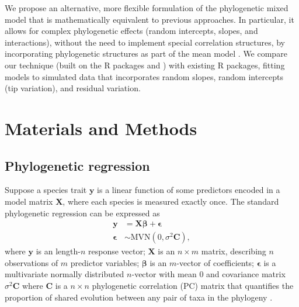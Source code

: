 \documentclass[12pt]{article}
\begin{document}


We propose an alternative, more flexible formulation of the phylogenetic mixed model that is mathematically equivalent to previous approaches.
In particular, it allows for complex phylogenetic effects (random intercepts, slopes, and interactions), without the need to implement special correlation structures, by incorporating phylogenetic structures as part of the mean model \citep{hefley2017basis}.
We compare our technique (built on the R packages  and ) with existing R packages, fitting models to simulated data that incorporates random slopes, random intercepts (tip variation), and residual variation.

\section*{Materials and Methods}

\newcommand{\bX}{{\mathbf X}}
\newcommand{\bbeta}{{\boldsymbol \beta}}
\newcommand{\bmu}{{\boldsymbol \mu}}
\newcommand{\bY}{{\mathbf y}}  %
\newcommand{\bC}{{\mathbf C}}
\newcommand{\bZ}{{\mathbf Z}}
\newcommand{\bb}{{\mathbf b}}
\newcommand{\besp}{{\boldsymbol \epsilon}}
\newcommand{\bSigma}{{\boldsymbol \Sigma}}

\subsection*{Phylogenetic regression}

Suppose a species trait $\bY$ is a linear function of some predictors encoded in a model matrix $\bX$, where each species is measured exactly once. 
The standard phylogenetic regression can be expressed as
\begin{equation}
\begin{aligned}
\bY & = \bX \bbeta + \besp  \\
\besp & \sim \textrm{MVN}(0,\sigma^{2} \bC), 
\label{eq:gls}
\end{aligned}
\end{equation}
where $\bY$ is an length-$n$ response vector; $\bX$ is an $n \times m$ matrix, describing $n$ observations of $m$ predictor variables; $\bbeta$ is an $m$-vector of coefficients; $\besp$ is a multivariate normally distributed $n$-vector with mean $0$ and covariance matrix $\sigma^{2} \bC$ where $\bC$ is a $n \times n$ phylogenetic correlation (PC) matrix that quantifies the proportion of shared evolution between any pair of taxa in the phylogeny \citep{garamszegi2014modern}.
\end{document}
